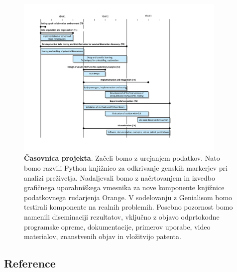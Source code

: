 \documentclass[11pt,a4paper]{article}
\renewcommand{\bold}{\textbf}
\begin{document}
\begin{figure}
\includegraphics[width=0.90\textwidth]{gantt}
\caption{\small\bold{Časovnica projekta}. Začeli bomo z urejanjem podatkov. Nato bomo razvili Python knjižnico za odkrivanje genskih markerjev pri analizi preživetja. Nadaljevali bomo z načrtovanjem in izvedbo grafičnega uporabniškega vmesnika za nove komponente knjižnice podatkovnega rudarjenja Orange. V sodelovanju z Genialisom bomo testirali komponente na realnih problemih. Posebno pozornost bomo namenili  diseminaciji rezultatov, vključno z objavo odprtokodne programske opreme, dokumentacije, primerov uporabe, video materialov, znanstvenih objav in vložitvijo patenta.}
\label{fig:gantt}
\end{figure}

\clearpage
\subsection*{Reference}


\begin{multicols}{2}
\footnotesize
\setlength{\parskip}{0em}
\renewcommand{\baselinestretch}{1.0}


\end{multicols}
\end{document}
